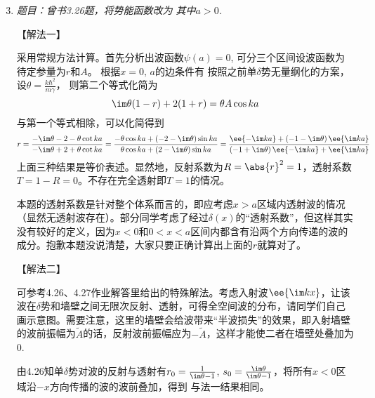 \begin{enumerate}[label=\textbf{4.\Alph*}, listparindent=\parindent]
\setcounter{enumi}{2}
\item \emph{题目：曾书3.26题，将势能函数改为
其中$a>0$.}

\noindent【解法一】

采用常规方法计算。首先分析出波函数$\psi(a)=0$, 可分三个区间设波函数为
待定参量为$r$和$A$。
根据$x=0,\,a$的边条件有
按照之前单$\delta$势无量纲化的方案，设$\theta = \frac{k\hbar^2}{m\gamma}$，
则第二个等式化简为
\[\im\theta (1-r)+2(1+r)=\theta A\cos ka\]
与第一个等式相除，可以化简得到
\[r = \frac{-\im\theta-2-\theta\cot ka}{-\im\theta+2+\theta\cot ka}
= \frac{-\theta \cos ka + (-2-\im\theta)\sin ka}{\theta \cos ka + (2-\im\theta)\sin ka}
= \frac{\ee{-\im ka}+(-1-\im\theta)\,\ee{\im ka}}{(-1+\im\theta)\,\ee{-\im ka}+\ee{\im ka}}\]
上面三种结果是等价表述。显然地，反射系数为$R=\abs{r}^2=1$，透射系数$T=1-R=0$。不存在完全透射即$T=1$的情况。

本题的透射系数是针对整个体系而言的，即应考虑$x>a$区域内透射波的情况（显然无透射波存在）。部分同学考虑了经过$\delta(x)$的“透射系数”，但这样其实没有较好的定义，因为$x<0$和$0<x<a$区间内都含有沿两个方向传递的波的成分。抱歉本题没说清楚，大家只要正确计算出上面的$r$就算对了。

\noindent【解法二】

可参考4.26、4.27作业解答里给出的特殊解法。考虑入射波$\ee{\im kx}$，让该波在$\delta$势和墙壁之间无限次反射、透射，可得全空间波的分布，请同学们自己画示意图。需要注意，这里的墙壁会给波带来“半波损失”的效果，即入射墙壁的波前振幅为$\tilde{A}$的话，反射波前振幅应为$-\tilde{A}$，这样才能使二者在墙壁处叠加为0.

由4.26知单$\delta$势对波的反射与透射有$r_0=\frac{1}{\im\theta-1}$, $s_0=\frac{\im\theta}{\im\theta-1}$，将所有$x<0$区域沿$-x$方向传播的波的波前叠加，得到
与法一结果相同。
\end{enumerate}

